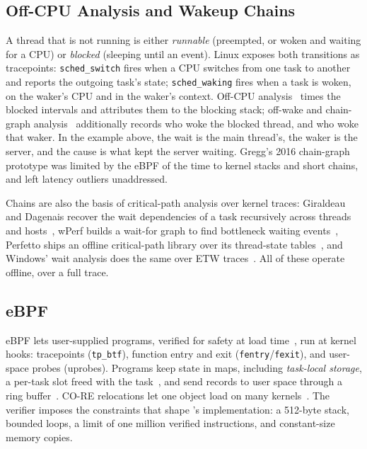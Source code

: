 \subsection{Off-CPU Analysis and Wakeup Chains}
\label{sec:offcpu}

A thread that is not running is either \emph{runnable} (preempted, or woken
and waiting for a CPU) or \emph{blocked} (sleeping until an event). Linux
exposes both transitions as tracepoints: \texttt{sched\_switch} fires when a
CPU switches from one task to another and reports the outgoing task's state;
\texttt{sched\_waking} fires when a task is woken, on the waker's CPU and in
the waker's context. Off-CPU analysis~\cite{gregg-offcpu} times the blocked
intervals and attributes them to the blocking stack; off-wake and chain-graph
analysis~\cite{gregg-chaingraph} additionally records who woke the blocked
thread, and who woke that waker. In the example above, the wait is the
main thread's, the waker is the server, and the cause is what kept the
server waiting. Gregg's 2016 chain-graph prototype was limited by the eBPF
of the time to kernel stacks and short chains, and left latency outliers
unaddressed.

Chains are also the basis of critical-path analysis over kernel traces:
Giraldeau and Dagenais recover the wait dependencies of a task recursively
across threads and hosts~\cite{giraldeau2016wait}, wPerf builds a wait-for
graph to find bottleneck waiting events~\cite{zhou2018wperf}, Perfetto
ships an offline critical-path library over its thread-state
tables~\cite{perfetto-critpath}, and Windows' wait analysis does the same
over ETW traces~\cite{ets-wait-analysis}. All of these operate offline, over
a full trace.

\subsection{eBPF}
\label{sec:ebpf}

eBPF lets user-supplied programs, verified for safety at load
time~\cite{gershuni2019verifier}, run at kernel hooks: tracepoints
(\texttt{tp\_btf}), function entry and exit (\texttt{fentry}/\texttt{fexit}),
and user-space probes (uprobes). Programs keep state in maps, including
\emph{task-local storage}, a per-task slot freed with the
task~\cite{bpf-task-storage}, and send records to user space through a ring
buffer~\cite{bpf-ringbuf}. CO-RE relocations let one object load on many
kernels~\cite{bpf-core}. The verifier imposes the constraints that shape
\sys's implementation: a 512-byte stack, bounded loops, a limit of one
million verified instructions, and constant-size memory copies.
